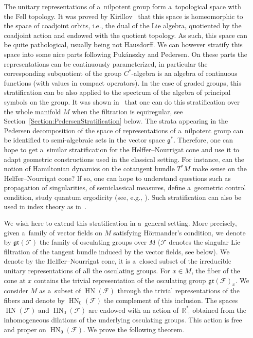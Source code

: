 \documentclass[pdftex]{sigma}
\newcommand{\R}{\mathbb R} %
\newcommand{\F}{\mathcal{F}} %
\newcommand{\g}{\mathfrak{g}} %
\newcommand{\HN}{\operatorname{HN}} %
\newcommand{\gr}{\mathfrak{gr}} %
\numberwithin{equation}{section}
\theoremstyle{definition}
\begin{document}
The unitary representations of a~nilpotent group form a~topological space with the Fell topology. It was proved by Kirillov~\cite{Kirillov} that this space is homeomorphic to the space of coadjoint orbits, i.e., the dual of the Lie algebra, quotiented by the coadjoint action and endowed with the quotient topology. As such, this space can be quite pathological, usually being not Hausdorff. We can however stratify this space into some nice parts following Puk\'anszky and Pedersen. On these parts the representations can be continuously parameterized, in particular the corresponding subquotient of the group $C^*$-algebra is an algebra of continuous functions (with values in compact operators). In the case of graded groups, this stratification can be also applied to the spectrum of the algebra of principal symbols on the group. It was shown in~\cite{CrenFilteredCrossedProduct} that one can do this stratification over the whole manifold $M$ when the filtration is equiregular, see Section~\ref{Section:PedersenStratification} below. The strata appearing in the Pedersen decomposition of the space of representations of a~nilpotent group can be identified to semi-algebraic sets in the vector space $\g^*$. Therefore, one can hope to get a~similar stratification for the Helffer--Nourrigat cone and use it to adapt geometric constructions used in the classical setting. For instance, can the notion of Hamiltonian dynamics on the cotangent bundle $T^*M$ make sense on the Helffer--Nourrigat cone? If so, one can hope to understand questions such as propagation of singularities, of semiclassical measures, define a~geometric control condition, study quantum ergodicity (see, e.g., \cite{benedetto}). Such stratification can also be used in index theory as in~\cite{GoffengKuzmin}.

We wish here to extend this stratification in a~general setting. More precisely, given a~family of vector fields on $M$ satisfying H\"ormander's condition, we denote by $\gr(\F)$ the family of osculating groups over $M$ ($\F$ denotes the singular Lie filtration of the tangent bundle induced by the vector fields, see below). We denote by \smash{$\HN(\F) \subset \widehat{\gr(\F)}$} the Helffer--Nourrigat cone, it is a~closed subset of the irreducible unitary representations of all the osculating groups. For $x \in M$, the fiber of the cone at $x$ contains the trivial representation of the osculating group $\gr(\F)_x$. We consider $M$ as a~subset of $\HN(\F)$ through the trivial representations of the fibers and denote by $\HN_0(\F)$ the complement of this inclusion. The spaces $\HN( \F)$ and $\HN_0(\F)$ are endowed with an action of~$\R^*_+$ obtained from the inhomogeneous dilations of the underlying osculating groups. This action is free and proper on $\HN_0(\F)$. We prove the following theorem.
\end{document}
